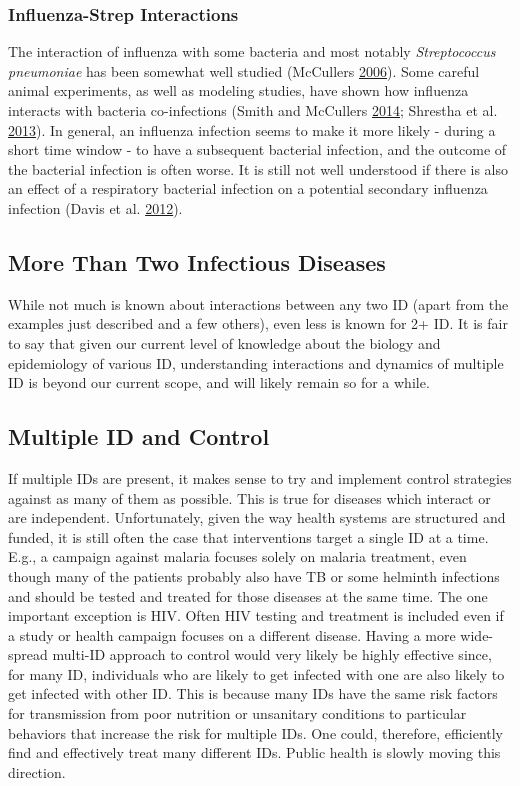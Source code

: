 \documentclass[]{article}
\theoremstyle{definition}
\theoremstyle{definition}
\theoremstyle{definition}
\theoremstyle{remark}
\begin{document}
\subsubsection{Influenza-Strep
Interactions}\label{influenza-strep-interactions}

The interaction of influenza with some bacteria and most notably
\emph{Streptococcus pneumoniae} has been somewhat well studied
(McCullers \protect\hyperlink{ref-mccullers06}{2006}). Some careful
animal experiments, as well as modeling studies, have shown how
influenza interacts with bacteria co-infections (Smith and McCullers
\protect\hyperlink{ref-smith14a}{2014}; Shrestha et al.
\protect\hyperlink{ref-shrestha13}{2013}). In general, an influenza
infection seems to make it more likely - during a short time window - to
have a subsequent bacterial infection, and the outcome of the bacterial
infection is often worse. It is still not well understood if there is
also an effect of a respiratory bacterial infection on a potential
secondary influenza infection (Davis et al.
\protect\hyperlink{ref-davis12}{2012}).

\subsection{More Than Two Infectious
Diseases}\label{more-than-two-infectious-diseases}

While not much is known about interactions between any two ID (apart
from the examples just described and a few others), even less is known
for 2+ ID. It is fair to say that given our current level of knowledge
about the biology and epidemiology of various ID, understanding
interactions and dynamics of multiple ID is beyond our current scope,
and will likely remain so for a while.

\subsection{Multiple ID and Control}\label{multiple-id-and-control}

If multiple IDs are present, it makes sense to try and implement control
strategies against as many of them as possible. This is true for
diseases which interact or are independent. Unfortunately, given the way
health systems are structured and funded, it is still often the case
that interventions target a single ID at a time. E.g., a campaign
against malaria focuses solely on malaria treatment, even though many of
the patients probably also have TB or some helminth infections and
should be tested and treated for those diseases at the same time. The
one important exception is HIV. Often HIV testing and treatment is
included even if a study or health campaign focuses on a different
disease. Having a more wide-spread multi-ID approach to control would
very likely be highly effective since, for many ID, individuals who are
likely to get infected with one are also likely to get infected with
other ID. This is because many IDs have the same risk factors for
transmission from poor nutrition or unsanitary conditions to particular
behaviors that increase the risk for multiple IDs. One could, therefore,
efficiently find and effectively treat many different IDs. Public health
is slowly moving this direction.
\end{document}
